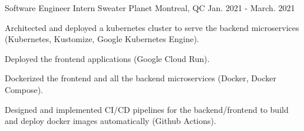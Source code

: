 \begin{cventries}

  \cventry
    {Software Engineer Intern} %
    {Sweater Planet} %
    {Montreal, QC} %
    {Jan. 2021 - March. 2021} %
    {
      \begin{cvitems} %
      \item{Architected and deployed a kubernetes cluster to serve the backend microservices (Kubernetes, Kustomize, Google Kubernetes Engine).} 
      \item{Deployed the frontend applications (Google Cloud Run).}
      \item{Dockerized the frontend and all the backend microservices (Docker, Docker Compose).}
      \item{Designed and implemented CI/CD pipelines for the backend/frontend to build and deploy docker images automatically (Github Actions).}
      \end{cvitems}
    }



\end{cventries}
